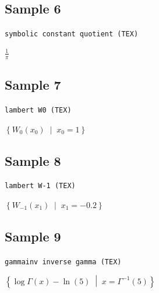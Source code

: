 \documentclass{article}
\begin{document}
\subsection*{Sample 6}
\noindent\texttt{symbolic constant quotient (TEX)}
\begin{flushleft}
$\displaystyle \frac{1}{\pi}$
\end{flushleft}

\subsection*{Sample 7}
\noindent\texttt{lambert W0 (TEX)}
\begin{flushleft}
$\displaystyle \left\{ W_{0}(x_{0}) \;\middle|\; x_{0} = 1 \right\}$
\end{flushleft}

\subsection*{Sample 8}
\noindent\texttt{lambert W-1 (TEX)}
\begin{flushleft}
$\displaystyle \left\{ W_{-1}(x_{1}) \;\middle|\; x_{1} = -0.2 \right\}$
\end{flushleft}

\subsection*{Sample 9}
\noindent\texttt{gammainv inverse gamma (TEX)}
\begin{flushleft}
$\displaystyle \left\{ \log\Gamma(x) - \ln(5) \;\middle|\; x = \Gamma^{-1}(5) \right\}$
\end{flushleft}
\end{document}
